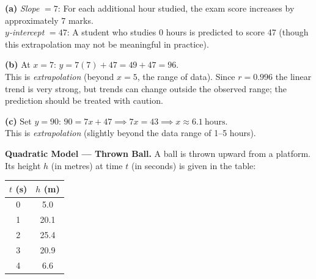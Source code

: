 \documentclass[addpoints]{exam}
\begin{document}
\begin{questions}

\begin{solution}
\textbf{(a)} \textit{Slope} $= 7$: For each additional hour studied, the exam score increases by approximately 7 marks.\\
\textit{$y$-intercept} $= 47$: A student who studies 0 hours is predicted to score 47 (though this extrapolation may not be meaningful in practice).

\textbf{(b)} At $x = 7$: $y = 7(7) + 47 = 49 + 47 = 96$.\\
This is \textit{extrapolation} (beyond $x = 5$, the range of data). Since $r = 0.996$ the linear trend is very strong, but trends can change outside the observed range; the prediction should be treated with caution.

\textbf{(c)} Set $y = 90$: $90 = 7x + 47 \implies 7x = 43 \implies x \approx 6.1\ \text{hours}$.\\
This is \textit{extrapolation} (slightly beyond the data range of 1--5 hours).
\end{solution}

\vspace{5mm}

\question[6]
\textbf{Quadratic Model --- Thrown Ball.}
A ball is thrown upward from a platform. Its height $h$ (in metres) at time $t$ (in seconds) is given in the table:

\begin{center}
\begin{tabular}{@{}cc@{}}
\toprule
$t$ (s) & $h$ (m) \\
\midrule
0 & 5.0 \\
1 & 20.1 \\
2 & 25.4 \\
3 & 20.9 \\
4 & 6.6 \\
\bottomrule
\end{tabular}
\end{center}


\end{questions}
\end{document}
